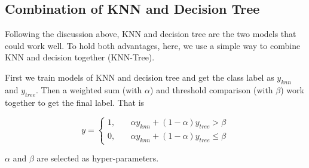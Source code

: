 \documentclass{article}
\begin{document}
\subsection{Combination of KNN and Decision Tree}

Following the discussion above, KNN and decision tree are the two models that could work well. To hold both advantages, here, we use a simple way to combine KNN and decision together (KNN-Tree).

First we train models of KNN and decision tree and get the class label as $y_{knn}$ and $y_{tree}$. Then a weighted sum (with $\alpha$) and threshold comparison (with $\beta$) work together to get the final label. That is

\begin{equation*}
    y=\left\{
    \begin{aligned}
        1,\quad & \alpha y_{knn}+(1-\alpha)y_{tree}>\beta\\
        0,\quad & \alpha y_{knn}+(1-\alpha)y_{tree}\le\beta
    \end{aligned}\right.
\end{equation*}

$\alpha$ and $\beta$ are selected as hyper-parameters.




\end{document}
